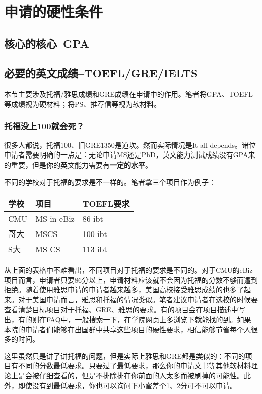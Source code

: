 \chapter{申请的硬性条件}
\newpage
\section{核心的核心--GPA}

\section{必要的英文成绩--TOEFL/GRE/IELTS}
本节主要涉及托福/雅思成绩和GRE成绩在申请中的作用。笔者将GPA、TOEFL等成绩视为硬材料；将PS、推荐信等视为软材料。
\subsection{托福没上100就会死？}
很多人都说，托福100、旧GRE1350是道坎。然而实际情况是It all depends。诸位申请者需要明确的一点是：无论申请MS还是PhD，英文能力测试成绩没有GPA来的重要，但是你的英文能力需要有\textbf{一定的水平}。\par
不同的学校对于托福的要求是不一样的。笔者拿三个项目作为例子：
\begin{center}
\begin{tabular}{|l|l|l|}
\hline
学校 & 项目 & TOEFL要求\\ \hline
CMU & MS in eBiz & 86 ibt\\
哥大 & MSCS & 100 ibt\\
S大 & MS CS & 113 ibt\\ \hline
\end{tabular}
\end{center}\par

从上面的表格中不难看出，不同项目对于托福的要求是不同的。对于CMU的eBiz项目而言，申请者只要86分以上，申请材料应该就不会因为托福的分数不够而遭到拒绝。随着使用雅思申请的申请者越来越多，美国高校接受雅思成绩的也多了起来。对于美国申请而言，雅思和托福的情况类似。笔者建议申请者在选校的时候要查看清楚目标项目对于托福、GRE、雅思的要求。有的项目会在项目描述中写出，有的则在FAQ中，一般搜索一下，在学院网页上多浏览下就能找的到。如果本院的申请者们能够在出国群中共享这些项目的硬性要求，相信能够节省每个人很多的时间。\par
这里虽然只是讲了讲托福的问题，但是实际上雅思和GRE都是类似的：不同的项目有不同的分数最低要求。只要过了最低要求，那么你的申请文书等其他软材料理论上是会被仔细查看的，但是不排除排在你前面的人太多而被刷掉的可能性。此外，即使没有到最低要求，你也可以询问下小蜜差个1、2分可不可以申请。\par

